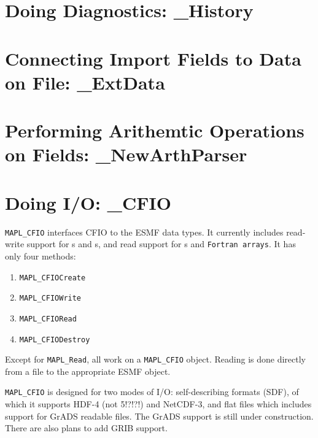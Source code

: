 \section{Doing Diagnostics: \ggn\_History}




\section{Connecting Import Fields to Data on File: \ggn\_ExtData}




\section{Performing Arithemtic Operations on Fields: \ggn\_NewArthParser}




\section{Doing I/O: \ggn\_CFIO}

{\tt MAPL\_CFIO}  interfaces CFIO to the ESMF data types.
It currently includes read-write support for \fld s and \stt s,
and read support for \fld s and \texttt{Fortran arrays}.
It has only four methods:
\begin{enumerate}
\item \texttt{MAPL\_CFIOCreate}
\item \texttt{MAPL\_CFIOWrite}
\item \texttt{MAPL\_CFIORead}
\item \texttt{MAPL\_CFIODestroy}
\end{enumerate}
Except for \texttt{MAPL\_Read}, all work on a \texttt{MAPL\_CFIO} object.
Reading is done directly from a file to the appropriate ESMF object.

{\tt MAPL\_CFIO} is designed for two modes of I/O: self-describing formats
(SDF), of which it supports HDF-4 (not 5!?!?!) and NetCDF-3, and flat files
which includes support for GrADS readable files. The GrADS support is still
under construction. There are also plans to add GRIB support. 


